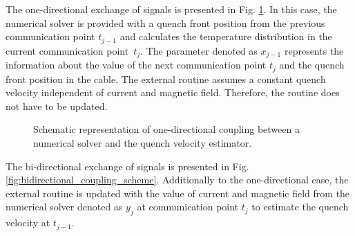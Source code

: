 The one-directional exchange of signals is presented in Fig. \ref{fig:unidirectional_coupling_scheme}. In this case, the numerical solver is provided with a quench front position from the previous communication point $t_{j-1}$ and calculates the temperature distribution in the current communication point~$t_j$. The parameter denoted as $x_{j-1}$ represents the information about the value of the next communication point $t_j$ and the quench front position in the cable. The external routine assumes a constant quench velocity independent of current and magnetic field. Therefore, the routine does not have to be updated.

\begin{figure}[H]
\centering
{}
\caption{Schematic representation of one-directional coupling between a numerical solver and the quench velocity estimator.}
\label{fig:unidirectional_coupling_scheme}
\end{figure}

The bi-directional exchange of signals is presented in Fig. \ref{fig:bidirectional_coupling_scheme}.
Additionally to the one-directional case, the external routine is updated with the value of current and magnetic field from the numerical solver denoted as $y_j$ at communication point $t_j$ to estimate the quench velocity at $t_{j-1}$.

